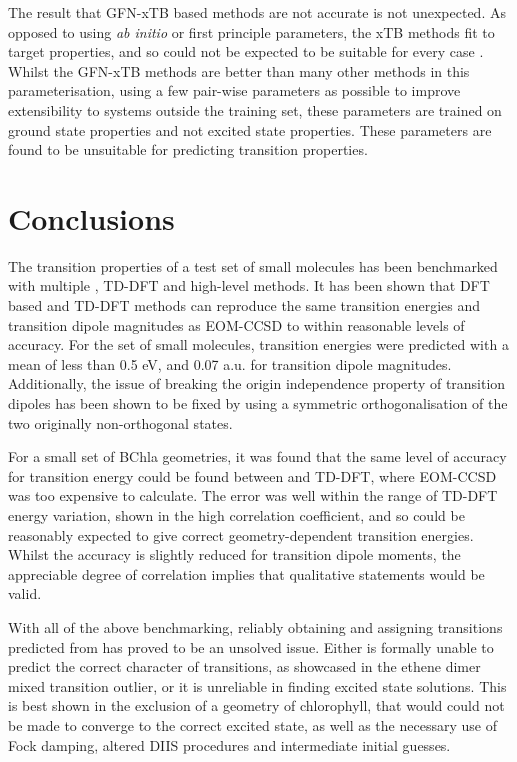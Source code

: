 The result that GFN-xTB based methods are not accurate is not unexpected. As opposed
to using \emph{ab initio} or first principle parameters, the xTB methods fit to target
properties, and so could not be expected to be suitable for every case \cite{Bannwarth2020}.
Whilst the GFN-xTB methods are better than many other methods in this parameterisation,
using a few pair-wise parameters as possible to improve extensibility to systems
outside the training set, these parameters are trained on ground state properties 
and not excited state properties. These parameters are found to be unsuitable for 
predicting transition properties.

\section{Conclusions}
The transition properties of a test set of small molecules has been benchmarked 
with multiple \dscf, TD-DFT and high-level methods. It has been shown that DFT 
based \dscf and TD-DFT methods can reproduce the same transition energies and 
transition dipole magnitudes as EOM-CCSD to within reasonable levels
of accuracy. For the set of small molecules, transition energies were predicted
with a mean of less than 0.5 eV, and 0.07 a.u. for transition dipole magnitudes.
Additionally, the issue of breaking the origin independence property of transition
dipoles has been shown to be fixed by using a symmetric orthogonalisation of the 
two originally non-orthogonal states.

For a small set of BChla geometries, it was found that the same level of accuracy
for transition energy could be found between \dscf and TD-DFT, where EOM-CCSD was
too expensive to calculate. The error was well within the range of TD-DFT energy
variation, shown in the high correlation coefficient, and so \dscf could be reasonably
expected to give correct geometry-dependent transition energies. Whilst the accuracy
is slightly reduced for transition dipole moments, the appreciable degree of correlation
implies that qualitative statements would be valid.

With all of the above benchmarking, reliably obtaining and assigning transitions
predicted from \dscf has proved to be an unsolved issue. Either \dscf is formally unable to 
predict the correct character of transitions, as showcased in the ethene dimer
mixed transition outlier, or it is unreliable in finding excited state solutions.
This is best shown in the exclusion of a geometry of chlorophyll, that would could
not be made to converge to the correct excited state, as well as the necessary use
of Fock damping, altered DIIS procedures and intermediate initial guesses.


